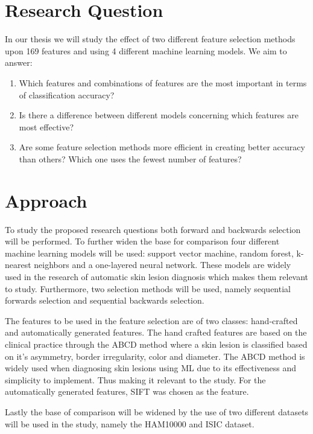 \documentclass{kththesis}
\begin{document}
\section{Research Question}
In our thesis we will study the effect of two different feature selection methods upon 169 features and using 4 different machine learning models. We aim to answer:
\begin{enumerate}
    \item Which features and combinations of features are the most important in terms of classification accuracy?
    \item Is there a difference between different models concerning which features are most effective?
    \item Are some feature selection methods more efficient in creating better accuracy than others? Which one uses the fewest number of features?
  
\end{enumerate}

\section{Approach}

To study the proposed research questions both forward and backwards selection will be performed. To further widen the base for comparison four different machine learning models will be used: support vector machine, random forest, k-nearest neighbors and a one-layered neural network. These models are widely used in the research of automatic skin lesion diagnosis which makes them relevant to study. %
Furthermore, two selection methods will be used, namely sequential forwards selection and sequential backwards selection. 

The features to be used in the feature selection are of two classes: hand-crafted and automatically generated features. The hand crafted features are based on the clinical practice through the ABCD method where a skin lesion is classified based on it’s asymmetry, border irregularity, color and diameter. The ABCD method is widely used when diagnosing skin lesions using ML due to its effectiveness and simplicity to implement. \parencite{JAIN2015735}
Thus making it relevant to the study. For the automatically generated features, SIFT was chosen as the feature. %

Lastly the base of comparison will be widened by the use of two different datasets will be used in the study, namely the HAM10000 and ISIC dataset. 
\end{document}
